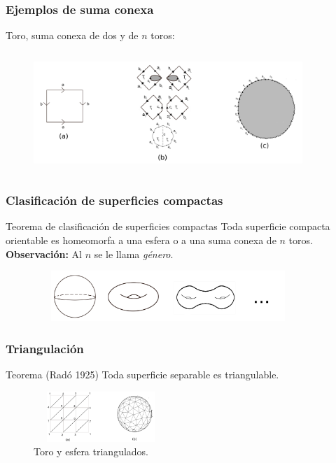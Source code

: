 \documentclass{beamer}
\begin{document}
\begin{frame}
\frametitle{Ejemplos de suma conexa}
Toro, suma conexa de dos y de $n$ toros:
\begin{figure}[htb]
\begin{center}
\includegraphics[width=4in,height=1.8in]{imagenes/sumaconexa1.png}
\end{center}
\end{figure}
\end{frame}


\begin{frame}
\frametitle{Clasificación de superficies compactas}
\begin{block}{Teorema de clasificación de superficies compactas}
Toda superficie compacta orientable es homeomorfa a una esfera o a una suma conexa de $n$ toros.\\
\textbf{Observación:} Al $n$ se le llama \textit{género}.
\end{block}

\begin{figure}[htb]
\begin{center}
\includegraphics[width=4in,height=0.75in]{imagenes/diapo4.png} 
\end{center}
\end{figure}
\end{frame}

\begin{frame}
\frametitle{Triangulación}
\begin{block}{Teorema (Radó 1925)}
Toda superficie separable es triangulable.
\end{block}


\begin{figure}[htb]
\begin{center}
\includegraphics[width=2in,height=0.75in]{imagenes/diapo3.png} 
\caption{Toro y esfera triangulados.}
\end{center}
\end{figure}

\end{frame}
\end{document}

